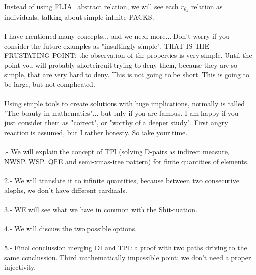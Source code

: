 	\noindent
	Instead of using FLJA\_abstract relation, we will see each $r_{\theta_{k}}$ relation as individuals, talking about simple infinite PACKS.
	\\\\
	
	\noindent
	I have mentioned many concepts... and we need more... Don't worry if you consider the future examples as "insultingly simple". THAT IS THE FRUSTATING POINT: the observation of the properties is very simple. Until the point you will probably shortcircuit trying to deny them, because they are so simple, that are very hard to deny. This is not going to be short. This is going to be large, but not complicated.
	\\\\
	
	\noindent
	Using simple tools to create solutions with huge implications, normally is called "The beauty in mathematics"... but only if you are famous. I am happy if you just consider them as "correct", or "worthy of a deeper study". First angry reaction is assumed, but I rather honesty. So take your time.
	\\\\
	
	.- We will explain the concept of TPI (solving D-pairs as indirect measure, NWSP, WSP, QRE and semi-xmas-tree pattern) for finite quantities of elements.\\\\
	2.- We will translate it to infinite quantities, because between two consecutive alephs, we don't have different cardinals.\\\\
	3.- WE will see what we have in common with the Shit-tuation.\\\\
	4.- We will discuss the two possible options.\\\\
	5.- Final conclussion merging DI and TPI: a proof with two paths driving to the same conclussion. Third mathematically impossible point: we don't need a proper injectivity.\\\\
	
	
	
		
	
	
	
